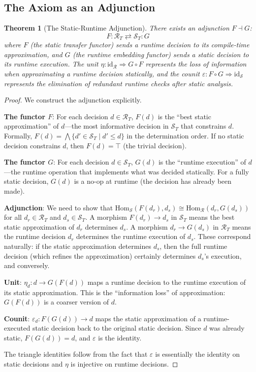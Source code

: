 \documentclass[11pt]{article}
\newtheorem{theorem}{Theorem}[section]
\newcommand{\id}{\mathrm{id}}
\begin{document}
\subsection{The Axiom as an Adjunction}

\begin{theorem}[The Static-Runtime Adjunction]
\label{thm:adjunction}
There exists an adjunction $F \dashv G$:
\[
  F : \mathcal{R}_T \rightleftarrows \mathcal{S}_T : G
\]
where $F$ (the \emph{static transfer} functor) sends a runtime decision to its
compile-time approximation, and $G$ (the \emph{runtime embedding} functor) sends a
static decision to its runtime execution. The unit $\eta : \id_{\mathcal{R}} \Rightarrow G \circ F$
represents the loss of information when approximating a runtime decision statically, and
the counit $\varepsilon : F \circ G \Rightarrow \id_{\mathcal{S}}$ represents the
elimination of redundant runtime checks after static analysis.
\end{theorem}

\begin{proof}
We construct the adjunction explicitly.

\textbf{The functor $F$}: For each decision $d \in \mathcal{R}_T$, $F(d)$ is the
``best static approximation'' of $d$---the most informative decision in $\mathcal{S}_T$
that constrains $d$. Formally, $F(d) = \bigwedge \{ d' \in \mathcal{S}_T \mid d' \leq d \}$
in the determination order. If no static decision constrains $d$, then $F(d) = \top$
(the trivial decision).

\textbf{The functor $G$}: For each decision $d \in \mathcal{S}_T$, $G(d)$ is the
``runtime execution'' of $d$---the runtime operation that implements what was decided
statically. For a fully static decision, $G(d)$ is a no-op at runtime (the decision
has already been made).

\textbf{Adjunction}: We need to show that
$\mathrm{Hom}_{\mathcal{S}}(F(d_r), d_s) \cong \mathrm{Hom}_{\mathcal{R}}(d_r, G(d_s))$
for all $d_r \in \mathcal{R}_T$ and $d_s \in \mathcal{S}_T$. A morphism $F(d_r) \to d_s$
in $\mathcal{S}_T$ means the best static approximation of $d_r$ determines $d_s$. A
morphism $d_r \to G(d_s)$ in $\mathcal{R}_T$ means the runtime decision $d_r$
determines the runtime execution of $d_s$. These correspond naturally: if the static
approximation determines $d_s$, then the full runtime decision (which refines the
approximation) certainly determines $d_s$'s execution, and conversely.

\textbf{Unit}: $\eta_d : d \to G(F(d))$ maps a runtime decision to the runtime
execution of its static approximation. This is the ``information loss'' of approximation:
$G(F(d))$ is a coarser version of $d$.

\textbf{Counit}: $\varepsilon_d : F(G(d)) \to d$ maps the static approximation of a
runtime-executed static decision back to the original static decision. Since $d$ was
already static, $F(G(d)) = d$, and $\varepsilon$ is the identity.

The triangle identities follow from the fact that $\varepsilon$ is essentially the
identity on static decisions and $\eta$ is injective on runtime decisions.
\end{proof}
\end{document}
